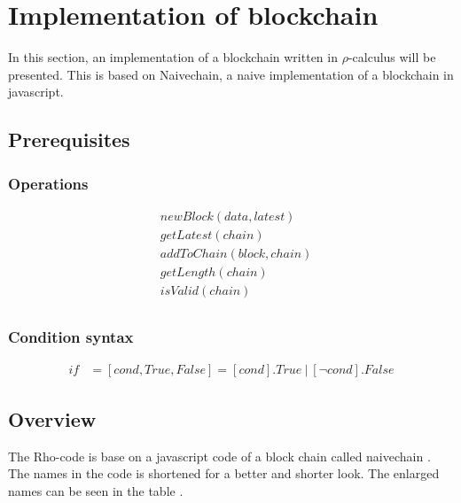 \section{Implementation of blockchain}
In this section, an implementation of a blockchain written in $\rho$-calculus will be presented. This is based on Naivechain, a naive implementation of a blockchain in javascript.

\subsection{Prerequisites}

\subsubsection{Operations}

\begin{align*}
    &newBlock(data,latest)\\
    &getLatest(chain)\\
    &addToChain(block,chain)\\
    &getLength(chain)\\
    &isValid(chain)\\
\end{align*}

\subsubsection{Condition syntax}

\begin{align*}
    if &= [cond,True,False] = [cond].True\ |\ [\neg cond].False
\end{align*}

\subsection{Overview}
The Rho-code is base on a javascript code of a block chain called naivechain \cite{naivechain}.
The names in the code is shortened for a better and shorter look. The enlarged names can be seen in the table .

